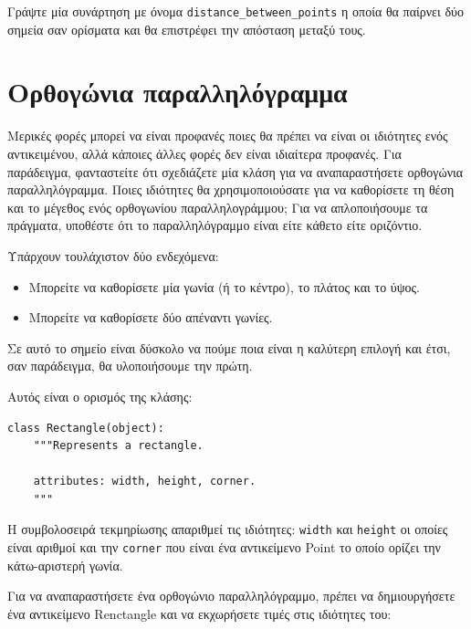 \documentclass[10pt]{book}
\begin{document}
\begin{exercise}

Γράψτε μία συνάρτηση με όνομα \verb"distance_between_points" η οποία θα παίρνει δύο σημεία σαν ορίσματα
και θα επιστρέφει την απόσταση μεταξύ τους.
\end{exercise}



\section{Ορθογώνια παραλληλόγραμμα}
\label{rectangles}

Μερικές φορές μπορεί να είναι προφανές ποιες θα πρέπει να είναι οι ιδιότητες ενός αντικειμένου, αλλά κάποιες 
άλλες φορές δεν είναι ιδιαίτερα προφανές. Για παράδειγμα, φανταστείτε ότι σχεδιάζετε μία κλάση για να
αναπαραστήσετε ορθογώνια παραλληλόγραμμα. Ποιες ιδιότητες θα χρησιμοποιούσατε για να καθορίσετε τη θέση
και το μέγεθος ενός ορθογωνίου παραλληλογράμμου; Για να απλοποιήσουμε τα πράγματα, υποθέστε ότι το
παραλληλόγραμμο είναι είτε κάθετο είτε οριζόντιο.

Υπάρχουν τουλάχιστον δύο ενδεχόμενα:

\begin{itemize}

\item  Μπορείτε να καθορίσετε μία γωνία (ή το κέντρο), το πλάτος και το ύψος.

\item  Μπορείτε να καθορίσετε δύο απέναντι γωνίες.  

\end{itemize}

Σε αυτό το σημείο είναι δύσκολο να πούμε ποια είναι η καλύτερη επιλογή και έτσι, σαν παράδειγμα,
θα υλοποιήσουμε την πρώτη.

Αυτός είναι ο ορισμός της κλάσης:

\begin{verbatim}
class Rectangle(object):
    """Represents a rectangle.

    attributes: width, height, corner.
    """
\end{verbatim}
%
Η συμβολοσειρά τεκμηρίωσης απαριθμεί τις ιδιότητες: {\tt width} και {\tt height} οι οποίες είναι αριθμοί και 
την {\tt corner} που είναι ένα αντικείμενο Point το οποίο ορίζει την κάτω-αριστερή γωνία.

Για να αναπαραστήσετε ένα ορθογώνιο παραλληλόγραμμο, πρέπει να δημιουργήσετε ένα αντικείμενο Renctangle και να
εκχωρήσετε τιμές στις ιδιότητες του:
\end{document}
